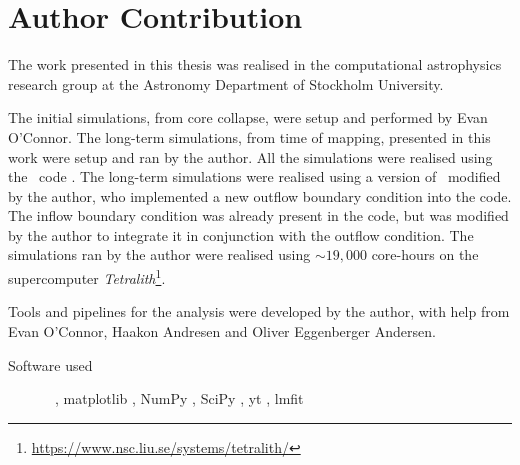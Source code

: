 \chapter*{Author Contribution}
\vspace{1.5cm}


The work presented in this thesis was realised in the computational astrophysics research group at the Astronomy Department of Stockholm University.

The initial simulations, from core collapse, were setup and performed by Evan O'Connor. The long-term simulations, from time of mapping, presented in this work were setup and ran by the author. All the simulations were realised using the \flash\ code \citep{Fryxell2000}. The long-term simulations were realised using a version of \flash\ modified by the author, who implemented a new outflow boundary condition into the code. The inflow boundary condition was already present in the code, but was modified by the author to integrate it in conjunction with the outflow condition. The simulations ran by the author were realised using \(\sim 19,000\) core-hours on the supercomputer \emph{Tetralith}\footnote{\url{https://www.nsc.liu.se/systems/tetralith/}}.

Tools and pipelines for the analysis were developed by the author, with help from Evan O'Connor, Haakon Andresen and Oliver Eggenberger Andersen.

\begin{description}
    \item[Software used] \flash\ \citep{Fryxell2000}, matplotlib \citep{Hunter2007}, NumPy \citep{Harris2020}, SciPy \citep{Virtanen2020}, yt \citep{Turk2011}, lmfit \citep{Newville2015}
\end{description}
